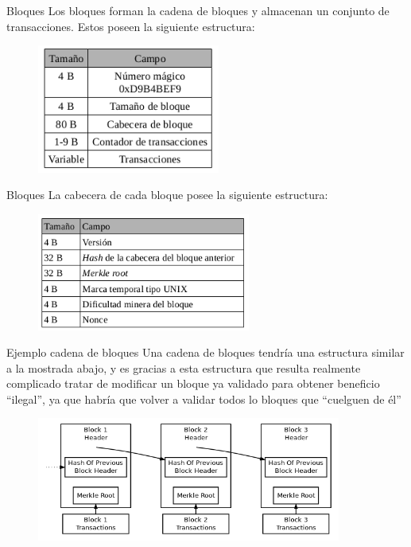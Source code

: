 \documentclass[compress,brown,xcolor=table]{beamer}
\begin{document}
\begin{frame}{Bloques}
	Los bloques forman la cadena de bloques y almacenan un conjunto de transacciones. Estos poseen la siguiente estructura:
	\begin{figure}
		\includegraphics[width=6cm]{../images/blockstructure.png}
		\centering		
		\label{p4}
	\end{figure}

\end{frame}

\begin{frame}{Bloques}
	La cabecera de cada bloque posee la siguiente estructura:
	\begin{figure}
		\includegraphics[width=7cm]{../images/headerstructure.png}
		\centering		
		\label{p4}
	\end{figure}
\end{frame}

\begin{frame}{Ejemplo cadena de bloques}
	Una cadena de bloques tendría una estructura similar a la mostrada abajo, y es gracias a esta estructura que resulta realmente complicado tratar de modificar un bloque ya validado para obtener beneficio ``ilegal'', ya que habría que volver a validar todos lo bloques que ``cuelguen de él''
	\begin{figure}[h]
	\includegraphics[width=10cm]{../images/blockchain.png}
	\centering		
	\label{p3}
\end{figure}

\end{frame}
\end{document}
